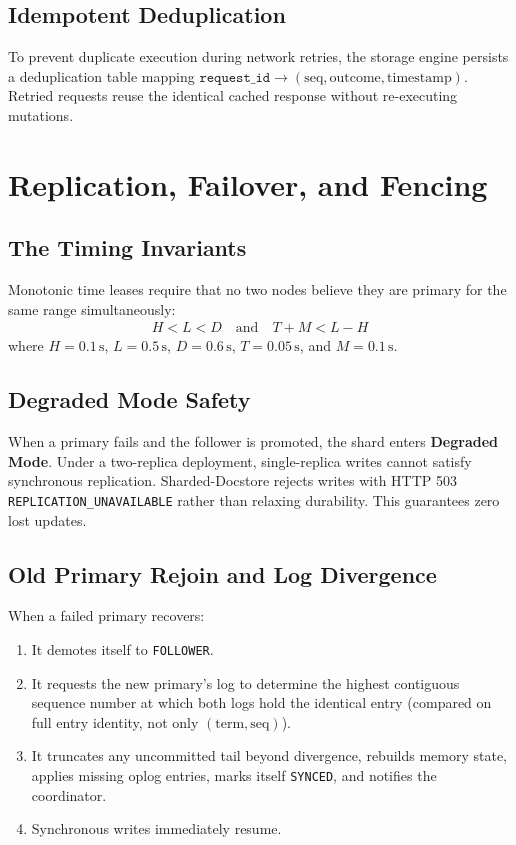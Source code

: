 \documentclass[10pt,journal,compsoc]{IEEEtran}
\begin{document}
\subsection{Idempotent Deduplication}
To prevent duplicate execution during network retries, the storage engine persists a deduplication table mapping $\texttt{request\_id} \to (\text{seq}, \text{outcome}, \text{timestamp})$. Retried requests reuse the identical cached response without re-executing mutations.

\section{Replication, Failover, and Fencing}

\subsection{The Timing Invariants}
Monotonic time leases require that no two nodes believe they are primary for the same range simultaneously:
\begin{align}
H < L < D \quad \text{and} \quad T + M < L - H
\end{align}
where $H=0.1\,\text{s}$, $L=0.5\,\text{s}$, $D=0.6\,\text{s}$, $T=0.05\,\text{s}$, and $M=0.1\,\text{s}$.

\subsection{Degraded Mode Safety}
When a primary fails and the follower is promoted, the shard enters \textbf{Degraded Mode}. Under a two-replica deployment, single-replica writes cannot satisfy synchronous replication. Sharded-Docstore rejects writes with HTTP 503 \texttt{REPLICATION\_UNAVAILABLE} rather than relaxing durability. This guarantees zero lost updates.

\subsection{Old Primary Rejoin and Log Divergence}
When a failed primary recovers:
\begin{enumerate}
    \item It demotes itself to \texttt{FOLLOWER}.
    \item It requests the new primary's log to determine the highest contiguous sequence number at which both logs hold the identical entry (compared on full entry identity, not only $(\text{term}, \text{seq})$).
    \item It truncates any uncommitted tail beyond divergence, rebuilds memory state, applies missing oplog entries, marks itself \texttt{SYNCED}, and notifies the coordinator.
    \item Synchronous writes immediately resume.
\end{enumerate}
\end{document}
